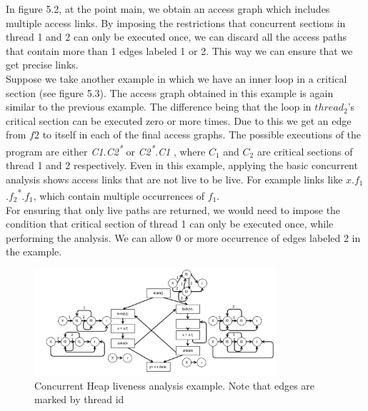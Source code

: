 In figure 5.2, at the point main, we obtain an access graph which includes multiple access links. By imposing the restrictions that concurrent sections in thread 1 and 2 can only be executed once, we can discard all the access paths that contain more than 1 edges labeled 1 or 2. This way we can ensure that we get precise links. \\

Suppose we take another example in which we have an inner loop in a critical section (see figure 5.3). The access  graph obtained in this example is again similar to the previous example. The difference being that the loop in $thread_2$'s critical section can be executed zero or more times. Due to this we get an edge from $f2$ to itself in each of the final access graphs. The possible executions of the program are either \emph{C1.C2\textsuperscript{*} } or \emph{ C2\textsuperscript{*}.C1 } , where $C_1$ and $C_2$ are critical sections of thread 1 and 2 respectively. Even in this example, applying the basic concurrent analysis shows access links that are not live to be live. For example links like {$x$.$f_1$.$f_2$\textsuperscript{*}.$f_1$}, which contain multiple occurrences of $f_1$. \\

For ensuring that only live paths are returned, we would need to impose the condition that critical section of thread 1 can only be executed once, while performing the analysis. We can allow 0 or more occurrence of edges labeled 2 in the example. \\ 

\begin{figure}
	\centering
	\includegraphics[width=0.8\textwidth]{Figures/rsz_crop.png}
	\caption{Concurrent Heap liveness analysis example. Note that edges are marked by thread id}
	\label{fig:threadidanalysis}
\end{figure}

          